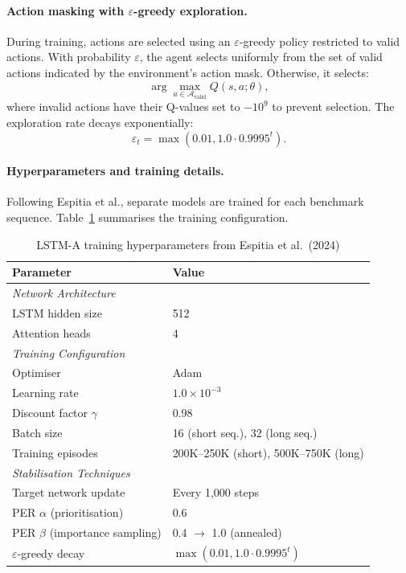 \documentclass{article}
\theoremstyle{plain}
\theoremstyle{definition}
\begin{document}
\paragraph{Action masking with $\varepsilon$-greedy exploration.} During training, actions are selected using an $\varepsilon$-greedy policy restricted to valid actions. With probability $\varepsilon$, the agent selects uniformly from the set of valid actions indicated by the environment's action mask. Otherwise, it selects:
\begin{equation}
\arg\max_{a \in \mathcal{A}_{\text{valid}}} Q(s,a;\theta),
\end{equation}
where invalid actions have their Q-values set to $-10^9$ to prevent selection. The exploration rate decays exponentially:
\begin{equation}
\varepsilon_t = \max(0.01, 1.0 \cdot 0.9995^t).
\end{equation}

\paragraph{Hyperparameters and training details.} Following Espitia et al., separate models are trained for each benchmark sequence. Table~\ref{tab:lstm_hyperparameters} summarises the training configuration.

\begin{table}[htbp]
\centering
\caption{LSTM-A training hyperparameters from Espitia et al.\ (2024)}\label{tab:lstm_hyperparameters}
\begin{tabular}{ll}
\toprule
\textbf{Parameter} & \textbf{Value} \\
\midrule
\multicolumn{2}{l}{\textit{Network Architecture}} \\
LSTM hidden size & 512 \\
Attention heads & 4 \\
\midrule
\multicolumn{2}{l}{\textit{Training Configuration}} \\
Optimiser & Adam \\
Learning rate & $1.0 \times 10^{-3}$ \\
Discount factor $\gamma$ & 0.98 \\
Batch size & 16 (short seq.), 32 (long seq.) \\
Training episodes & 200K--250K (short), 500K--750K (long) \\
\midrule
\multicolumn{2}{l}{\textit{Stabilisation Techniques}} \\
Target network update & Every 1,000 steps \\
PER $\alpha$ (prioritisation) & 0.6 \\
PER $\beta$ (importance sampling) & 0.4 $\to$ 1.0 (annealed) \\
$\varepsilon$-greedy decay & $\max(0.01, 1.0 \cdot 0.9995^t)$ \\
\bottomrule
\end{tabular}
\end{table}
\end{document}
